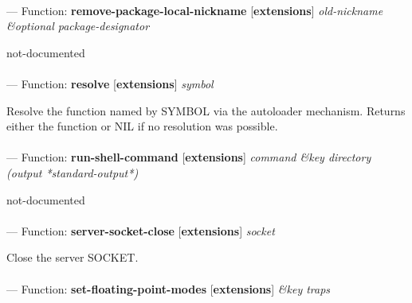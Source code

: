 \paragraph{}
\label{EXTENSIONS:REMOVE-PACKAGE-LOCAL-NICKNAME}
--- Function: \textbf{remove-package-local-nickname} [\textbf{extensions}] \textit{old-nickname \&optional package-designator}

\begin{adjustwidth}{5em}{5em}
not-documented
\end{adjustwidth}

\paragraph{}
\label{EXTENSIONS:RESOLVE}
--- Function: \textbf{resolve} [\textbf{extensions}] \textit{symbol}

\begin{adjustwidth}{5em}{5em}
Resolve the function named by SYMBOL via the autoloader mechanism.
Returns either the function or NIL if no resolution was possible.
\end{adjustwidth}

\paragraph{}
\label{EXTENSIONS:RUN-SHELL-COMMAND}
--- Function: \textbf{run-shell-command} [\textbf{extensions}] \textit{command \&key directory (output *standard-output*)}

\begin{adjustwidth}{5em}{5em}
not-documented
\end{adjustwidth}

\paragraph{}
\label{EXTENSIONS:SERVER-SOCKET-CLOSE}
--- Function: \textbf{server-socket-close} [\textbf{extensions}] \textit{socket}

\begin{adjustwidth}{5em}{5em}
Close the server SOCKET.
\end{adjustwidth}

\paragraph{}
\label{EXTENSIONS:SET-FLOATING-POINT-MODES}
--- Function: \textbf{set-floating-point-modes} [\textbf{extensions}] \textit{\&key traps}

